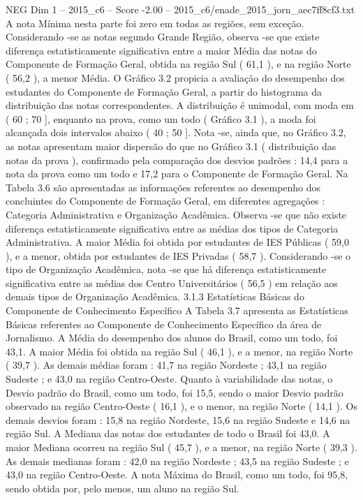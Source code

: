 \begin{textsample}{NEG Dim 1 – 2015\_c6 – Score -2.00 – 2015\_c6/enade\_2015\_jorn\_aec7ff8cf3.txt}
A nota Mínima nesta parte foi zero em todas as regiões, sem exceção.
Considerando -se as notas segundo Grande Região, observa -se que existe diferença estatisticamente significativa entre a maior Média das notas do Componente de Formação Geral, obtida na região Sul ( 61,1 ), e na região Norte ( 56,2 ), a menor Média.
O Gráfico 3.2 propicia a avaliação do desempenho dos estudantes do Componente de Formação Geral, a partir do histograma da distribuição das notas correspondentes.
A distribuição é unimodal, com moda em ( 60 ; 70 ], enquanto na prova, como um todo ( Gráfico 3.1 ), a moda foi alcançada dois intervalos abaixo ( 40 ; 50 ].
Nota -se, ainda que, no Gráfico 3.2, as notas apresentam maior dispersão do que no Gráfico 3.1 ( distribuição das notas da prova ), confirmado pela comparação dos desvios padrões : 14,4 para a nota da prova como um todo e 17,2 para o Componente de Formação Geral.
Na Tabela 3.6 são apresentadas as informações referentes ao desempenho dos concluintes do Componente de Formação Geral, em diferentes agregações : Categoria Administrativa e Organização Acadêmica.
Observa -se que não existe diferença estatisticamente significativa entre as médias dos tipos de Categoria Administrativa.
A maior Média foi obtida por estudantes de IES Públicas ( 59,0 ), e a menor, obtida por estudantes de IES Privadas ( 58,7 ).
Considerando -se o tipo de Organização Acadêmica, nota -se que há diferença estatisticamente significativa entre as médias dos Centro Universitários ( 56,5 ) em relação aos demais tipos de Organização Acadêmica. 3.1.3 Estatísticas Básicas do Componente de Conhecimento Específico A Tabela 3.7 apresenta as Estatísticas Básicas referentes ao Componente de Conhecimento Específico da área de Jornalismo.
A Média do desempenho dos alunos do Brasil, como um todo, foi 43,1.
A maior Média foi obtida na região Sul ( 46,1 ), e a menor, na região Norte ( 39,7 ).
As demais médias foram : 41,7 na região Nordeste ; 43,1 na região Sudeste ; e 43,0 na região Centro-Oeste.
Quanto à variabilidade das notas, o Desvio padrão do Brasil, como um todo, foi 15,5, sendo o maior Desvio padrão observado na região Centro-Oeste ( 16,1 ), e o menor, na região Norte ( 14,1 ).
Os demais desvios foram : 15,8 na região Nordeste, 15,6 na região Sudeste e 14,6 na região Sul.
A Mediana das notas dos estudantes de todo o Brasil foi 43,0.
A maior Mediana ocorreu na região Sul ( 45,7 ), e a menor, na região Norte ( 39,3 ).
As demais medianas foram : 42,0 na região Nordeste ; 43,5 na região Sudeste ; e 43,0 na região Centro-Oeste.
A nota Máxima do Brasil, como um todo, foi 95,8, sendo obtida por, pelo menos, um aluno na região Sul.

\end{textsample}
